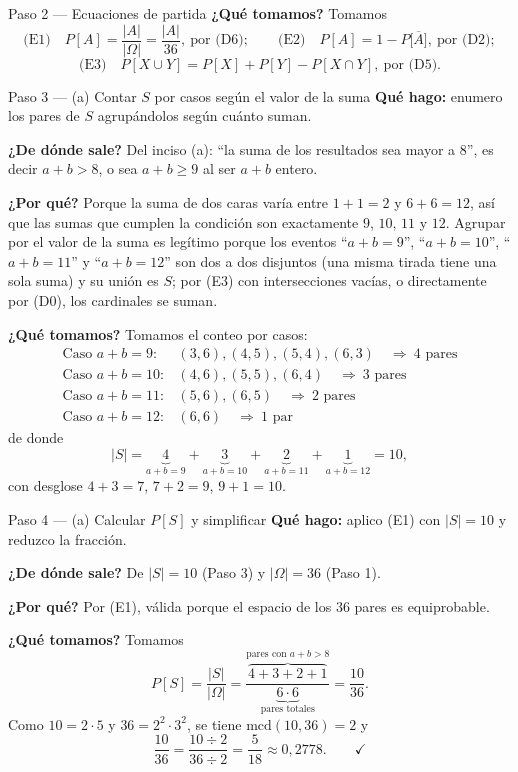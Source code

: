 \documentclass[11pt]{article}
\begin{document}
\begin{sol}
\begin{paso}{Paso 2 --- Ecuaciones de partida}
\textbf{¿Qué tomamos?} Tomamos
\[
\text{(E1)}\quad P[A]=\frac{|A|}{|\Omega|}=\frac{|A|}{36},\ \text{por (D6)};
\qquad
\text{(E2)}\quad P[A]=1-P\big[\overline{A}\big],\ \text{por (D2)};
\]
\[
\text{(E3)}\quad P[X\cup Y]=P[X]+P[Y]-P[X\cap Y],\ \text{por (D5)}.
\]
\end{paso}

\begin{paso}{Paso 3 --- (a) Contar $S$ por casos según el valor de la suma}
\textbf{Qué hago:} enumero los pares de $S$ agrupándolos según cuánto suman.

\textbf{¿De dónde sale?} Del inciso (a): ``la suma de los resultados sea mayor a 8'', es decir
$a+b>8$, o sea $a+b\ge 9$ al ser $a+b$ entero.

\textbf{¿Por qué?} Porque la suma de dos caras varía entre $1+1=2$ y $6+6=12$, así que las sumas
que cumplen la condición son exactamente $9$, $10$, $11$ y $12$. Agrupar por el valor de la suma
es legítimo porque los eventos ``$a+b=9$'', ``$a+b=10$'', ``$a+b=11$'' y ``$a+b=12$'' son dos a
dos disjuntos (una misma tirada tiene una sola suma) y su unión es $S$; por (E3) con
intersecciones vacías, o directamente por (D0), los cardinales se suman.

\textbf{¿Qué tomamos?} Tomamos el conteo por casos:
\[
\begin{array}{ll}
\text{Caso } a+b=9: & (3,6),(4,5),(5,4),(6,3) \quad\Rightarrow\ 4 \text{ pares}\\
\text{Caso } a+b=10: & (4,6),(5,5),(6,4) \quad\Rightarrow\ 3 \text{ pares}\\
\text{Caso } a+b=11: & (5,6),(6,5) \quad\Rightarrow\ 2 \text{ pares}\\
\text{Caso } a+b=12: & (6,6) \quad\Rightarrow\ 1 \text{ par}
\end{array}
\]
de donde
\[
|S|=\underbrace{4}_{a+b=9}+\underbrace{3}_{a+b=10}+\underbrace{2}_{a+b=11}+\underbrace{1}_{a+b=12}=10 ,
\]
con desglose $4+3=7$, $7+2=9$, $9+1=10$.
\end{paso}

\begin{paso}{Paso 4 --- (a) Calcular $P[S]$ y simplificar}
\textbf{Qué hago:} aplico (E1) con $|S|=10$ y reduzco la fracción.

\textbf{¿De dónde sale?} De $|S|=10$ (Paso 3) y $|\Omega|=36$ (Paso 1).

\textbf{¿Por qué?} Por (E1), válida porque el espacio de los $36$ pares es equiprobable.

\textbf{¿Qué tomamos?} Tomamos
\[
P[S]=\frac{|S|}{|\Omega|}
=\frac{\overbrace{4+3+2+1}^{\text{pares con }a+b>8}}{\underbrace{6\cdot 6}_{\text{pares totales}}}
=\frac{10}{36}.
\]
Como $10=2\cdot 5$ y $36=2^{2}\cdot 3^{2}$, se tiene $\mathrm{mcd}(10,36)=2$ y
\[
\frac{10}{36}=\frac{10\div 2}{36\div 2}=\frac{5}{18}\approx 0{,}2778 . \qquad\checkmark
\]
\end{paso}


\end{sol}
\end{document}
